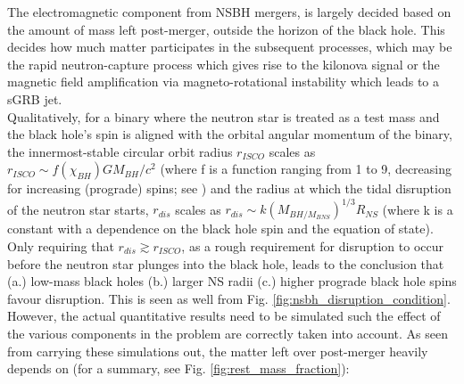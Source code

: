     The electromagnetic component from NSBH mergers, is largely decided based on the
    amount of mass left post-merger, outside the horizon of the black hole. This decides
    how much matter participates in the subsequent processes, which may be the rapid
    neutron-capture process which gives rise to the kilonova signal or the magnetic
    field amplification via magneto-rotational instability which leads to a sGRB jet.\\

    Qualitatively, for a binary where the neutron star is treated as a test mass and the
    black hole's spin is aligned with the orbital angular momentum of the binary, the
    innermost-stable circular orbit radius $r_{ISCO}$ scales as $r_{ISCO} \sim
    f(\chi_{BH}) G M_{BH}/c^2$ (where f is a function ranging from 1 to 9, decreasing
    for increasing (prograde) spins; see \cite{bardeen_1972}) and the radius at which
    the tidal disruption of the neutron star starts, $r_{dis}$ scales as $r_{dis} \sim k
    (M_{BH/M_{BNS}})^{1/3} R_{NS}$ (where k is a constant with a dependence on the black
    hole spin and the equation of state). Only requiring that $r_{dis} \gtrsim
    r_{ISCO}$, as a rough requirement for disruption to occur before the neutron star
    plunges into the black hole, leads to the conclusion that (a.) low-mass black holes
    (b.) larger NS radii (c.) higher prograde black hole spins favour disruption. This
    is seen as well from Fig. \ref{fig:nsbh_disruption_condition}. However, the actual
    quantitative results need to be simulated such the effect of the various components
    in the problem are correctly taken into account. As seen from carrying these
    simulations out, the matter left over post-merger heavily depends on (for a summary,
    see Fig. \ref{fig:rest_mass_fraction}):

